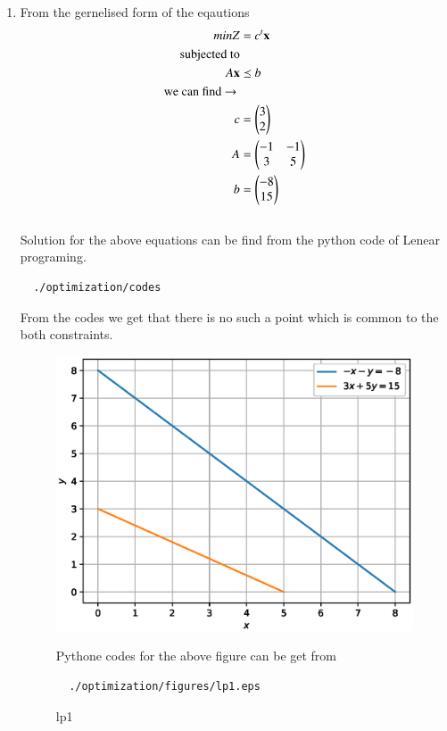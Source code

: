 \renewcommand{\theequation}{\theenumi}
\begin{enumerate}[label=\arabic*.,ref=\thesubsection.\theenumi]
\item From the gernelised form of the eqautions 
\begin{align}
minZ &= c^t \mathbf{x}
\\
\text{subjected to}
\\
A\mathbf{x} &\preceq b
\\ 
\text{we can find $\to$ }
\\
 c &= \begin{pmatrix}3 \\ 2\end{pmatrix}
 \\
 A &= \begin{pmatrix}-1 & -1 \\ 3 & 5\end{pmatrix}
 \\
 b &= \begin{pmatrix}-8 \\ 15\end{pmatrix}
 \\
 \end{align}\\
  Solution for the above equations can be find from the python code of Lenear programing. 
  \begin{lstlisting}
  ./optimization/codes
  \end{lstlisting}
  From the codes we get that there is no such a point which is common to the both constraints.
  
  \begin{figure}[!ht]
  	\centering
  	\includegraphics[width=\columnwidth]{./figures/lp1.eps}
  	\caption{ lp1 }
  	\label{fig:lp1}
  Pythone codes for the above figure can be get from
  \begin{lstlisting}
  ./optimization/figures/lp1.eps
  \end{lstlisting}	
  \end{figure}
\end{enumerate}